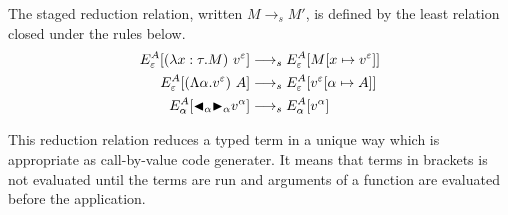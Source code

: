 \begin{definition}
	The staged reduction relation, written $M \longrightarrow_s M'$, is defined by
	the least relation closed under the rules below.
	\begin{align*}
		E^A_\varepsilon [(\lambda x:\tau.M)\ v^\varepsilon] & \longrightarrow_s E^A_\varepsilon[M[x\mapsto v^\varepsilon]]      \\
		E^A_\varepsilon [(\Lambda\alpha.v^\varepsilon)\ A]  & \longrightarrow_s E^A_\varepsilon[v^\varepsilon[\alpha\mapsto A]] \\
		E^A_\alpha [{\mathop{\blacktriangleleft}}_\alpha {\mathop{\blacktriangleright}}_\alpha v^\alpha]        & \longrightarrow_s E^A_\alpha[v^\alpha]                            \\
	\end{align*}
\end{definition}

This reduction relation reduces a typed term in a unique way 
which is appropriate as call-by-value code generater.
It means that terms in brackets is not evaluated until the terms are run
and arguments of a function are evaluated before the application.
